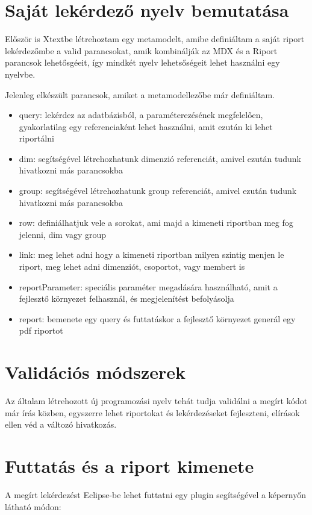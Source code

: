 \section{Saját lekérdező nyelv bemutatása}

Először is Xtextbe létrehoztam egy metamodelt, amibe definiáltam a saját riport
lekérdezőmbe a valid parancsokat, amik kombinálják az MDX és a Riport parancsok
lehetősgéeit, így mindkét nyelv lehetsőségeit lehet használni egy nyelvbe.

Jelenleg elkészült parancsok, amiket a metamodellezőbe már definiáltam.
\begin{itemize}
  \item query: lekérdez az adatbázisból, a paraméterezésének megfelelően,
  gyakorlatilag egy referenciaként lehet használni, amit ezután ki lehet
  riportálni
  \item dim: segítségével létrehozhatunk dimenzió referenciát, amivel ezután
  tudunk hivatkozni más parancsokba
  \item group: segítségével létrehozhatunk group referenciát, amivel ezután
  tudunk hivatkozni más parancsokba
  \item row: definiálhatjuk vele a sorokat, ami majd a kimeneti riportban meg
  fog jelenni, dim vagy group
  \item link: meg lehet adni hogy a kimeneti riportban milyen szintig menjen le
  riport, meg lehet adni dimenziót, csoportot, vagy membert is
  \item reportParameter: speciális paraméter megadására használható, amit a
  fejlesztő környezet felhasznál, és megjelenítést befolyásolja
  \item report: bemenete egy query és futtatáskor a fejlesztő környezet generál
  egy pdf riportot 
\end{itemize}


\section{Validációs módszerek}
Az általam létrehozott új programozási nyelv tehát tudja validálni a megírt
kódot már írás közben, egyszerre lehet riportokat és lekérdezéseket fejleszteni,
elírások ellen véd a változó hivatkozás.

\section{Futtatás és a riport kimenete}
A megírt lekérdezést Eclipse-be lehet futtatni egy plugin segítségével a
képernyőn látható módon:

